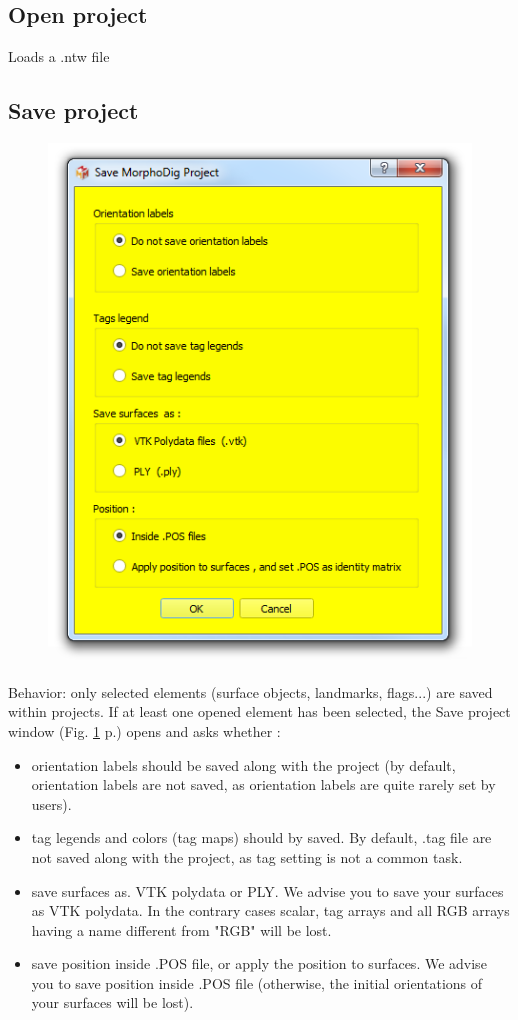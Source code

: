 \subsection{Open project}
Loads a .ntw file

\subsection{Save project}
\begin{figure}
  \centering  
 \includegraphics[scale=0.5]{images/07/project/save_ntw.png}
\label{save_project_file}
\end{figure}
Behavior: only selected elements (surface objects, landmarks, flags...) are saved within projects. If at least one opened element has been selected, the Save project window (Fig. \ref{save_project_file} p.\pageref{save_project_file}) opens and asks whether :  
\begin{itemize}
\item orientation labels should be saved along with the project (by default, orientation labels are not saved, as orientation labels are quite rarely set by users). 
\item tag legends and colors (tag maps) should by saved. By default, .tag file are not saved along with the project, as tag setting is not a common task. 
\item save surfaces as. VTK polydata or PLY. We advise you to save your surfaces as VTK polydata. In the contrary cases scalar,  tag arrays and all RGB arrays having a name different from "RGB" will be lost.
\item save position inside .POS file, or apply the position to surfaces. We advise you to save position inside .POS file (otherwise, the initial orientations of your surfaces will be lost). 
\end{itemize}
